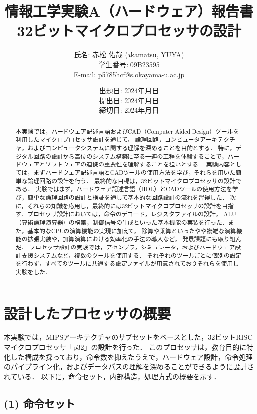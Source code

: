 \documentclass[autodetect-engine,dvi=dvipdfmx,ja=standard,
               a4j,11pt]{bxjsarticle}
\title{{\normalsize 情報工学実験A（ハードウェア）報告書}\\
        32ビットマイクロプロセッサの設計    }
\author{氏名: 赤松 佑哉 (akamatsu, YUYA) \\
        学生番号: 09B23595\\
        E-mail: p5785hcf@s.okayama-u.ac.jp}
\date{出題日: 2024年月日 \\
      提出日: 2024年月日 \\
      締切日: 2024年月日 \\}  %
\begin{document}
\maketitle
\begin{abstract}
本実験では，ハードウェア記述言語およびCAD（Computer Aided Design）ツールを利用したマイクロプロセッサ設計を通じて，
論理回路，コンピュータアーキテクチャ，およびコンピュータシステムに関する理解を深めることを目的とする．
特に，デジタル回路の設計から高位のシステム構築に至る一連の工程を体験することで，ハードウェアとソフトウェアの連携の重要性を理解することを狙いとする．
実験内容としては，まずハードウェア記述言語とCADツールの使用方法を学び，それらを用いた簡単な論理回路の設計を行う．
最終的な目標は，32ビットマイクロプロセッサの設計である．
実験ではまず，ハードウェア記述言語（HDL）とCADツールの使用方法を学び，簡単な論理回路の設計と検証を通して基本的な回路設計の流れを習得した．
次に，それらの知識を応用し，最終的には32ビットマイクロプロセッサの設計を目指す．プロセッサ設計においては，命令のデコード，レジスタファイルの設計，
ALU（算術論理演算器）の構築，制御信号の生成といった基本機能の実装を行った．また，基本的なCPUの演算機能の実現に加えて，
除算や乗算といったやや複雑な演算機能の拡張実装や，加算演算における効率化の手法の導入など，
発展課題にも取り組んだ．
プロセッサ設計の実験では，アセンブラ，シミュレータ，およびハードウェア設計支援システムなど，複数のツールを使用する．
それぞれのツールごとに個別の設定を行わず，すべてのツールに共通する設定ファイルが用意されておりそれらを使用し実験をした．
\end{abstract}
\section{設計したプロセッサの概要}
本実験では，MIPSアーキテクチャのサブセットをベースとした，32ビットRISCマイクロプロセッサ「p32」の設計を行った．
このプロセッサは，教育目的に特化した構成を採っており，命令数を抑えたうえで，ハードウェア設計，命令処理のパイプライン化，およびデータパスの理解を深めることができるように設計されている．
以下に，命令セット，内部構造，処理方式の概要を示す．

\subsection*{(1) 命令セット}
\end{document}
